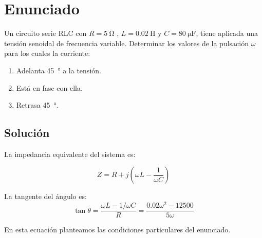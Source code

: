 
\section{Enunciado}
Un circuito serie RLC con $R = \qty{5}{\ohm}$ , $L = \qty{0.02}{\henry}$ y $C=\qty{80}{\micro\farad}$, tiene aplicada una tensión senoidal de frecuencia variable. Determinar los valores de la pulsación $\omega$ para los cuales la corriente:
\begin{enumerate}
\item Adelanta \qty{45}{\degree} a la tensión.
\item Está en fase con ella.
\item Retrasa \qty{45}{\degree}.
\end{enumerate}

\subsection*{Solución}
La impedancia equivalente del sistema es:

\begin{equation*}
  \overline{Z} = R + j (\omega L - \frac{1}{\omega C})
\end{equation*}

La tangente del ángulo es:
\begin{equation*}
  \tan \theta = \frac{\omega L - 1/\omega C}{R} = \frac{0.02\omega^2 - 12500}{5\omega}
\end{equation*}

En esta ecuación planteamos las condiciones particulares del enunciado.

